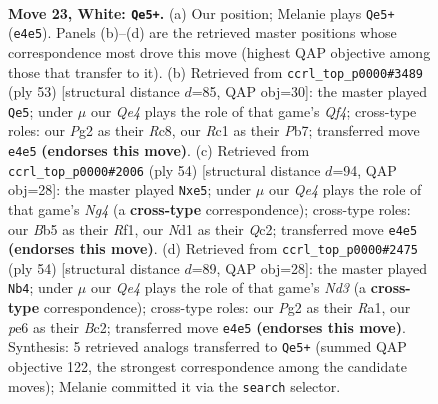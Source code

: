 \documentclass[11pt]{article}
\begin{document}
\clearpage

\begin{figure}[p]\centering
\begin{subfigure}{0.46\textwidth}\centering
\resizebox{\linewidth}{!}{%
\newchessgame
\chessboard[
  setfen={1nb2r1k/2q5/1p2p1p1/1B3pN1/3PQ1p1/8/r1P2PP1/2RN1K2 w - - 0 23},
  showmover=false,
  pgfstyle=straightmove, color=movearrow, markmove={e4-e5}
]}
\caption{}
\end{subfigure}\hfill
\begin{subfigure}{0.46\textwidth}\centering
\resizebox{\linewidth}{!}{%
\newchessgame
\chessboard[
  setfen={2r3k1/pp3p1p/1b3n1B/5qp1/B7/2PQP2P/PP4P1/3R2K1 b - - 2 27},
  showmover=false,
  pgfstyle=straightmove, color=movearrow, markmove={f5-e5}
]}
\caption{}
\end{subfigure}
\\[4pt]
\begin{subfigure}{0.46\textwidth}\centering
\resizebox{\linewidth}{!}{%
\newchessgame
\chessboard[
  setfen={3rq2k/pbr3pB/1p6/n3p2p/3P2N1/2P5/P1Q3PP/5RK1 w - - 2 28},
  showmover=false,
  pgfstyle=straightmove, color=movearrow, markmove={g4-e5}
]}
\caption{}
\end{subfigure}\hfill
\begin{subfigure}{0.46\textwidth}\centering
\resizebox{\linewidth}{!}{%
\newchessgame
\chessboard[
  setfen={5r1k/2q2pp1/3ppn1p/1p6/3Pb2P/2PN2Q1/1PB2PP1/R5K1 w - - 0 28},
  showmover=false,
  pgfstyle=straightmove, color=movearrow, markmove={d3-b4}
]}
\caption{}
\end{subfigure}
\caption{\textbf{Move 23, White: \texttt{Qe5+}.} (a) Our position; Melanie plays \texttt{Qe5+} (\texttt{e4e5}). Panels (b)--(d) are the retrieved master positions whose correspondence most drove this move (highest QAP objective among those that transfer to it). (b) Retrieved from \texttt{ccrl\_top\_p0000\#3489} (ply 53) [structural distance $d$=85, QAP obj=30]: the master played \texttt{Qe5}; under $\mu$ our \emph{Qe4} plays the role of that game's \emph{Qf4}; cross-type roles: our \emph{P}g2 as their \emph{R}c8, our \emph{R}c1 as their \emph{P}b7; transferred move \texttt{e4e5} \textbf{(endorses this move)}. (c) Retrieved from \texttt{ccrl\_top\_p0000\#2006} (ply 54) [structural distance $d$=94, QAP obj=28]: the master played \texttt{Nxe5}; under $\mu$ our \emph{Qe4} plays the role of that game's \emph{Ng4} (a \textbf{cross-type} correspondence); cross-type roles: our \emph{B}b5 as their \emph{R}f1, our \emph{N}d1 as their \emph{Q}c2; transferred move \texttt{e4e5} \textbf{(endorses this move)}. (d) Retrieved from \texttt{ccrl\_top\_p0000\#2475} (ply 54) [structural distance $d$=89, QAP obj=28]: the master played \texttt{Nb4}; under $\mu$ our \emph{Qe4} plays the role of that game's \emph{Nd3} (a \textbf{cross-type} correspondence); cross-type roles: our \emph{P}g2 as their \emph{R}a1, our \emph{p}e6 as their \emph{B}c2; transferred move \texttt{e4e5} \textbf{(endorses this move)}. Synthesis: 5 retrieved analogs transferred to \texttt{Qe5+} (summed QAP objective 122, the strongest correspondence among the candidate moves); Melanie committed it via the \texttt{search} selector.}
\label{fig:thought-m44}
\end{figure}
\end{document}
